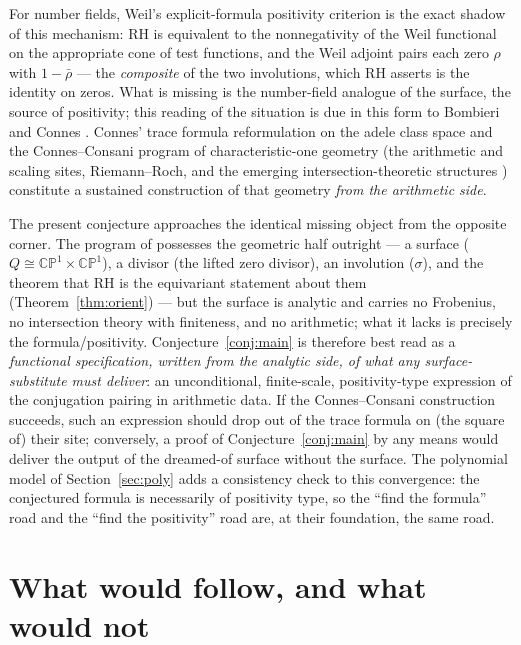 \documentclass[11pt]{amsart}
\theoremstyle{definition}
\theoremstyle{remark}
\newcommand{\CP}{\mathbb{CP}}
\begin{document}
For number fields, Weil's explicit-formula positivity criterion \cite{Weil1952} is the exact shadow of this mechanism: RH is equivalent to the nonnegativity of the Weil functional on the appropriate cone of test functions, and the Weil adjoint pairs each zero $\rho$ with $1-\bar\rho$ --- the \emph{composite} of the two involutions, which RH asserts is the identity on zeros. What is missing is the number-field analogue of the surface, the source of positivity; this reading of the situation is due in this form to Bombieri \cite{Bombieri} and Connes \cite{ConnesEssay}. Connes' trace formula reformulation on the adele class space \cite{Connes1999} and the Connes--Consani program of characteristic-one geometry (the arithmetic and scaling sites, Riemann--Roch, and the emerging intersection-theoretic structures \cite{ConnesConsani}) constitute a sustained construction of that geometry \emph{from the arithmetic side}.

The present conjecture approaches the identical missing object from the opposite corner. The program of \cite{ZS} possesses the geometric half outright --- a surface ($Q\cong\CP^1\times\CP^1$), a divisor (the lifted zero divisor), an involution ($\sigma$), and the theorem that RH is the equivariant statement about them (Theorem~\ref{thm:orient}) --- but the surface is analytic and carries no Frobenius, no intersection theory with finiteness, and no arithmetic; what it lacks is precisely the formula/positivity. Conjecture~\ref{conj:main} is therefore best read as a \emph{functional specification, written from the analytic side, of what any surface-substitute must deliver}: an unconditional, finite-scale, positivity-type expression of the conjugation pairing in arithmetic data. If the Connes--Consani construction succeeds, such an expression should drop out of the trace formula on (the square of) their site; conversely, a proof of Conjecture~\ref{conj:main} by any means would deliver the output of the dreamed-of surface without the surface. The polynomial model of Section~\ref{sec:poly} adds a consistency check to this convergence: the conjectured formula is necessarily of positivity type, so the ``find the formula'' road and the ``find the positivity'' road are, at their foundation, the same road.

\section{What would follow, and what would not}\label{sec:honesty}
\end{document}

